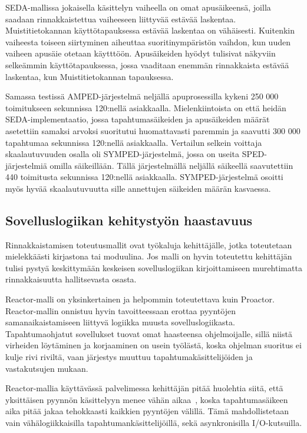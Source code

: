 \documentclass[finnish]{tktltiki2}
\theoremstyle{definition}
\theoremstyle{remark}
\begin{document}
SEDA-mallissa jokaisella käsittelyn vaiheella on omat apusäikeensä,
joilla saadaan rinnakkaistettua vaiheeseen liittyvää estävää laskentaa. 
Muistitietokannan käyttötapauksessa estävää laskentaa on vähäisesti.
Kuitenkin vaiheesta toiseen siirtyminen aiheuttaa suoritinympäristön vaihdon,
kun uuden vaiheen apusäie otetaan käytttöön. 
Apusäikeiden hyödyt
tulisivat näkyviin selkeämmin käyttötapauksessa, jossa vaaditaan enemmän
rinnakkaista estävää laskentaa, kun Muistitietokannan tapauksessa. 

Samassa testissä AMPED-järjestelmä neljällä apuprosessilla
kykeni 250 000 toimitukseen sekunnissa 120:nellä asiakkaalla. Mielenkiintoista on
että heidän SEDA-implementaatio, jossa tapahtumasäikeiden ja apusäikeiden
määrät asetettiin samaksi arvoksi suoritutui huomattavasti paremmin ja
saavutti 300 000 tapahtumaa sekunnissa 120:nellä asiakkaalla.
Vertailun selkein voittaja skaalautuvuuden
osalla oli SYMPED-järjestelmä, jossa on useita SPED-järjestelmiä
omilla säikeillään. Tällä järjestelmällä neljällä säikeellä
saavutettiin 440 toimitusta sekunnissa 120:nellä asiakkaalla.
SYMPED-järjestelmä osoitti myös hyvää skaalautuvuutta 
sille annettujen säikeiden määrän kasvaessa.


\subsection{Sovelluslogiikan kehitystyön haastavuus}
Rinnakkaistamisen toteutusmallit ovat työkaluja kehittäjälle,
jotka toteutetaan mielekkäästi kirjastona tai moduulina.
Jos malli on hyvin toteutettu kehittäjän tulisi pystyä
keskittymään keskeisen sovelluslogiikan kirjoittamiseen 
murehtimatta rinnakkaisuutta hallitsevasta osasta.

Reactor-malli on yksinkertainen ja helpommin toteutettava
kuin Proactor. Reactor-mallin onnistuu hyvin tavoitteessaan
erottaa pyyntöjen samanaikaistamiseen liittyvä logiikka
muusta sovelluslogiikasta.
Tapahtumaohjatut sovellukset tuovat omat haasteensa
ohjelmoijalle, sillä niistä virheiden löytäminen ja
korjaaminen on usein työlästä, koska ohjelman
suoritus ei kulje rivi riviltä, vaan järjestys
muuttuu tapahtumakäsittelijöiden ja vastakutsujen mukaan.

Reactor-mallia käyttävässä palvelimessa kehittäjän
pitää huolehtia siitä, että yksittäisen pyynnön
käsittelyyn menee vähän aikaa~\cite{pyarali_proactor_1997}, koska
tapahtumasäikeen aika pitää jakaa tehokkaasti
kaikkien pyyntöjen välillä. Tämä mahdollistetaan
vain vähälogiikkaisilla tapahtumankäsittelijöillä, sekä
asynkronisilla I/O-kutsuilla.
\end{document}

